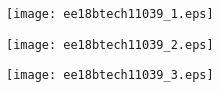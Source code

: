\begin{enumerate}[label=\thesubsection.\arabic*.,ref=\thesubsection.\theenumi]
\begin{figure}[!htb]
\begin{center}
\texttt{[image: ee18btech11039\_1.eps]}
\end{center}
\label{fig:ee18btech11039_1}
\end{figure}

\begin{figure}[!htb]
\begin{center}
\texttt{[image: ee18btech11039\_2.eps]}
\end{center}
\label{fig:ee18btech11039_2}
\end{figure}

\begin{figure}[!htb]
\begin{center}
\texttt{[image: ee18btech11039\_3.eps]}
\end{center}
\label{fig:ee18btech11039_3}
\end{figure}

\end{enumerate}




